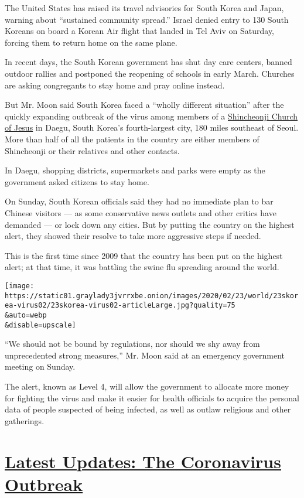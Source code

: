 The United States has raised its travel advisories for South Korea and
Japan, warning about ``sustained community spread.'' Israel denied entry
to 130 South Koreans on board a Korean Air flight that landed in Tel
Aviv on Saturday, forcing them to return home on the same plane.

In recent days, the South Korean government has shut day care centers,
banned outdoor rallies and postponed the reopening of schools in early
March. Churches are asking congregants to stay home and pray online
instead.

But Mr. Moon said South Korea faced a ``wholly different situation''
after the quickly expanding outbreak of the virus among members of a
\href{https://www.nytimes3xbfgragh.onion/2020/02/21/world/asia/south-korea-coronavirus-shincheonji.html}{Shincheonji
Church of Jesus} in Daegu, South Korea's fourth-largest city, 180 miles
southeast of Seoul. More than half of all the patients in the country
are either members of Shincheonji or their relatives and other contacts.

In Daegu, shopping districts, supermarkets and parks were empty as the
government asked citizens to stay home.

On Sunday, South Korean officials said they had no immediate plan to bar
Chinese visitors --- as some conservative news outlets and other critics
have demanded --- or lock down any cities. But by putting the country on
the highest alert, they showed their resolve to take more aggressive
steps if needed.

This is the first time since 2009 that the country has been put on the
highest alert; at that time, it was battling the swine flu spreading
around the world.

\texttt{[image: https://static01.graylady3jvrrxbe.onion/images/2020/02/23/world/23skorea-virus02/23skorea-virus02-articleLarge.jpg?quality=75\\\&auto=webp\\\&disable=upscale]}

``We should not be bound by regulations, nor should we shy away from
unprecedented strong measures,'' Mr. Moon said at an emergency
government meeting on Sunday.

The alert, known as Level 4, will allow the government to allocate more
money for fighting the virus and make it easier for health officials to
acquire the personal data of people suspected of being infected, as well
as outlaw religious and other gatherings.

\hypertarget{latest-updates-the-coronavirus-outbreak}{%
\section{\texorpdfstring{\href{https://www.nytimes3xbfgragh.onion/2020/08/17/world/coronavirus-covid.html?action=click\&pgtype=Article\&state=default\&region=MAIN_CONTENT_1\&context=storylines_live_updates}{Latest
Updates: The Coronavirus
Outbreak}}{Latest Updates: The Coronavirus Outbreak}}\label{latest-updates-the-coronavirus-outbreak}}

